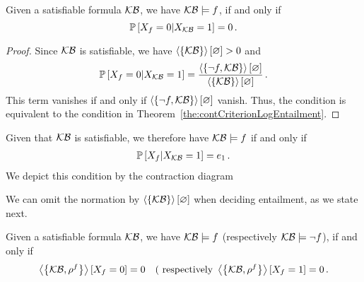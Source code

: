 % 
\begin{theorem}\label{the:probEntailment}
	Given a satisfiable formula $\mathcal{KB}$, we have $\mathcal{KB}\models f$, if and only if 
		\[ \mathbb{P}\left[X_{f}=0|X_{\mathcal{KB}}=1\right] = 0 \, .  \]
\end{theorem}
\begin{proof}
	Since $\mathcal{KB}$ is satisfiable, we have $\left\langle \left\{\mathcal{KB}\right\}\right\rangle \left[ \varnothing \right]>0$ and
		\[ \mathbb{P}\left[X_{f}=0|X_{\mathcal{KB}}=1\right] = \frac{\left\langle \left\{\lnot f, \mathcal{KB}\right\}\right\rangle \left[ \varnothing \right]}{\left\langle \left\{\mathcal{KB}\right\}\right\rangle \left[ \varnothing \right]} \, .  \]
	This term vanishes if and only if $\left\langle \left\{\lnot f, \mathcal{KB}\right\}\right\rangle \left[ \varnothing \right]$ vanish.
	Thus, the condition is equivalent to the condition in Theorem~\ref{the:contCriterionLogEntailment}.
\end{proof}

Given that $\mathcal{KB}$ is satisfiable, we therefore have $\mathcal{KB}\models f$ if and only if
\begin{align}
	\condprobof{\formulavar}{\kbvar=1} = %
	\tbasis \, .  %
\end{align}
We depict this condition by the contraction diagram
\begin{center}
	
\end{center}


We can omit the normation by $\left\langle \left\{\mathcal{KB}\right\}\right\rangle \left[ \varnothing \right]$ when deciding entailment, as we state next.

\begin{corollary}\label{cor:parallelCriterion}
	Given a satisfiable formula $\mathcal{KB}$, we have $\mathcal{KB}\models f$ (respectively $\mathcal{KB}\models\lnot f$), if and only if 
		\[ \left\langle \left\{\mathcal{KB},\rho^{f}\right\}\right\rangle \left[ X_{f}=0 \right] = 0 
		 \quad \text{( respectively }
		 \left\langle \left\{\mathcal{KB},\rho^{f}\right\}\right\rangle \left[ X_{f}=1 \right] = 0 \, . \]
\end{corollary}






